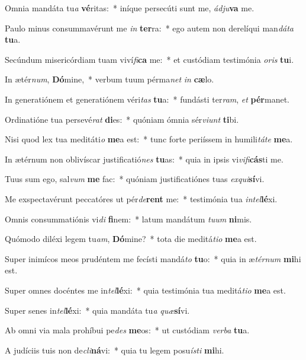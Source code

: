 \item Omnia mandáta tu\textit{a} \textbf{vé}ritas:~* iníque persecúti sunt me, \textit{ád}\textit{ju}\textbf{va} me.
\item Paulo minus consummavérunt me \textit{in} \textbf{ter}ra:~* ego autem non derelíqui man\textit{dá}\textit{ta} \textbf{tu}a.
\item Secúndum misericórdiam tuam viví\textit{fi}\textbf{ca} me:~* et custódiam testimónia \textit{o}\textit{ris} \textbf{tu}i.
\item In ætér\textit{num}, \textbf{Dó}mine,~* verbum tuum pérma\textit{net} \textit{in} \textbf{cæ}lo.
\item In generatiónem et generatiónem véri\textit{tas} \textbf{tu}a:~* fundásti ter\textit{ram}, \textit{et} \textbf{pér}manet.
\item Ordinatióne tua persevé\textit{rat} \textbf{di}es:~* quóniam ómnia sér\textit{vi}\textit{unt} \textbf{ti}bi.
\item Nisi quod lex tua meditáti\textit{o} \textbf{me}a est:~* tunc forte periíssem in humili\textit{tá}\textit{te} \textbf{me}a.
\item In ætérnum non oblivíscar justificatió\textit{nes} \textbf{tu}as:~* quia in ipsis vi\textit{vi}\textit{fi}\textbf{cás}ti me.
\item Tuus sum ego, sal\textit{vum} \textbf{me} fac:~* quóniam justificatiónes tuas \textit{ex}\textit{qui}\textbf{sí}vi.
\item Me exspectavérunt peccatóres ut pér\textit{de}\textbf{rent} me:~* testimónia tua \textit{in}\textit{tel}\textbf{lé}xi.
\item Omnis consummatiónis vi\textit{di} \textbf{fi}nem:~* latum mandátum \textit{tu}\textit{um} \textbf{ni}mis.
\item Quómodo diléxi legem tu\textit{am}, \textbf{Dó}mine?~* tota die meditá\textit{ti}\textit{o} \textbf{me}a est.
\item Super inimícos meos prudéntem me fecísti mandá\textit{to} \textbf{tu}o:~* quia in æ\textit{tér}\textit{num} \textbf{mi}hi est.
\item Super omnes docéntes me in\textit{tel}\textbf{lé}xi:~* quia testimónia tua meditá\textit{ti}\textit{o} \textbf{me}a est.
\item Super senes in\textit{tel}\textbf{lé}xi:~* quia mandáta tu\textit{a} \textit{quæ}\textbf{sí}vi.
\item Ab omni via mala prohíbui pe\textit{des} \textbf{me}os:~* ut custódiam \textit{ver}\textit{ba} \textbf{tu}a.
\item A judíciis tuis non de\textit{cli}\textbf{ná}vi:~* quia tu legem posu\textit{ís}\textit{ti} \textbf{mi}hi.
